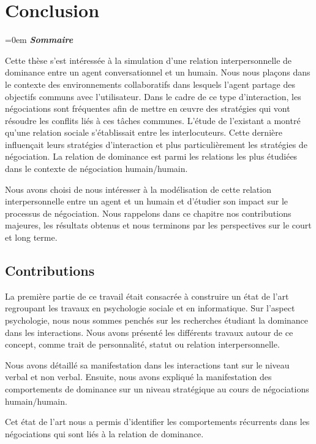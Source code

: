 \chapter{Conclusion}

\begingroup
\parindent=0em
\emph{\textbf{Sommaire}}
\localtableofcontents 
\clearpage
\endgroup


Cette thèse s'est intéressée à la simulation d'une relation interpersonnelle de dominance entre un agent conversationnel et un humain.
Nous nous plaçons dans le contexte des environnements collaboratifs dans lesquels l'agent partage des objectifs communs avec l'utilisateur. Dans le cadre de ce type d'interaction, les négociations sont fréquentes afin de mettre en œuvre des stratégies qui vont résoudre les conflits liés à ces tâches communes. 
L'étude de l'existant a montré qu'une relation sociale s'établissait entre les interlocuteurs. Cette dernière influençait leurs stratégies d'interaction et plus particulièrement les stratégies de négociation. La relation de dominance est parmi les relations les plus étudiées dans le contexte de négociation humain/humain. 

Nous avons choisi de nous intéresser à la modélisation de cette relation interpersonnelle entre un agent et un humain et d'étudier son impact sur le processus de négociation.  Nous rappelons dans ce chapitre nos contributions majeures, les résultats obtenus et nous terminons par les perspectives sur le court et long terme. 

\section{Contributions}

La première partie de ce travail était consacrée à construire un état de l'art regroupant les travaux en psychologie sociale et en informatique.  Sur l'aspect psychologie, nous nous sommes penchés sur les recherches étudiant la dominance dans les interactions. Nous avons présenté les différents travaux autour de ce concept, comme trait de personnalité, statut ou relation interpersonnelle.

Nous avons détaillé sa manifestation dans les interactions tant sur le niveau verbal et non verbal. Ensuite, nous avons expliqué la manifestation des comportements de dominance sur un niveau stratégique au cours de négociations humain/humain.

Cet état de l'art nous a permis d'identifier les comportements récurrents dans les négociations qui sont liés à la relation de dominance.

